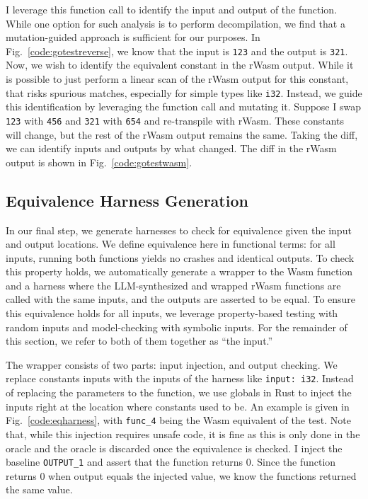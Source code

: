 \documentclass[12pt,openany,oneside,table]{cmuthesis}
\begin{document}
I leverage this function call to identify the input and output of the
function. While one option for such analysis is to perform
decompilation, we find that a mutation-guided approach is sufficient
for our purposes. In Fig.~\ref{code:gotestreverse}, we know that the
input is \lstinline{123} and the output is \lstinline{321}. Now, we wish to
identify the equivalent constant in the rWasm output. While it is
possible to just perform a linear scan of the rWasm output for this
constant, that risks spurious matches, especially for simple types
like \lstinline{i32}. Instead, we guide this identification by leveraging
the function call and mutating it. Suppose I swap \lstinline{123} with
\lstinline{456} and \lstinline{321} with \lstinline{654} and re-transpile with
rWasm. These constants will change, but the rest of the rWasm output
remains the same. Taking the diff, we can identify inputs and outputs
by what changed. The diff in the rWasm output is shown in
Fig.~\ref{code:gotestwasm}.

\subsection{Equivalence Harness Generation}
In our final step, we generate harnesses to check for equivalence
given the input and output locations. We define equivalence here in
functional terms: for all inputs, running both functions yields no
crashes and identical outputs. To check this property holds, we automatically
generate a wrapper to the Wasm function and a harness where the
LLM-synthesized and wrapped rWasm functions are called with the same
inputs, and the outputs are asserted to be equal. To ensure this
equivalence holds for all inputs, we leverage property-based testing
with random inputs and model-checking with symbolic inputs. For the
remainder of this section, we refer to both of them together as ``the
input.''

The wrapper consists of two parts: input injection, and output
checking. We replace constants inputs with the inputs of the harness
like \lstinline{input: i32}. Instead of replacing the parameters to the
function, we use globals in Rust to inject the inputs right at the
location where constants used to be. An example is given in
Fig.~\ref{code:eqharness}, with \lstinline{func_4} being the Wasm
equivalent of the test. Note that, while this injection requires
unsafe code, it is fine as this is only done in the oracle and the
oracle is discarded once the equivalence is checked.
%
I inject the baseline \lstinline{OUTPUT_1} and assert that the function
returns $0$. Since the function returns $0$ when output equals the
injected value, we know the functions returned the same value.
\end{document}
